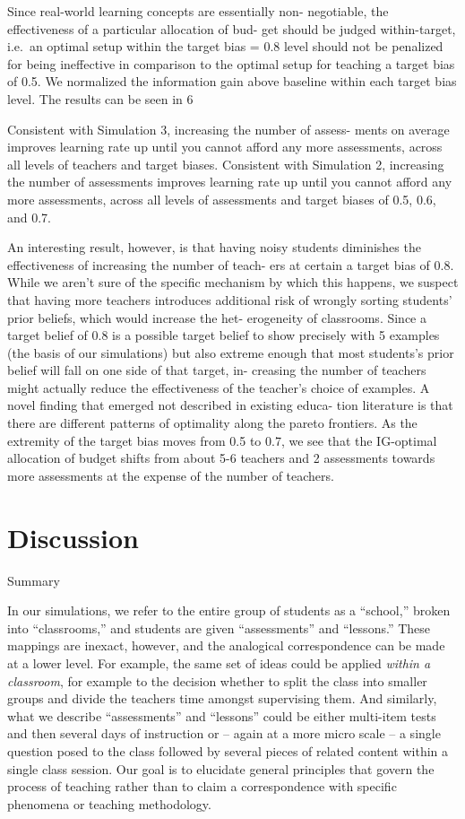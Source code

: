 \documentclass[10pt, letterpaper]{article}
\begin{document}
Since real-world learning concepts are essentially non- negotiable, the
effectiveness of a particular allocation of bud- get should be judged
within-target, i.e.~an optimal setup within the target bias = 0.8 level
should not be penalized for being ineffective in comparison to the
optimal setup for teaching a target bias of 0.5. We normalized the
information gain above baseline within each target bias level. The
results can be seen in 6

Consistent with Simulation 3, increasing the number of assess- ments on
average improves learning rate up until you cannot afford any more
assessments, across all levels of teachers and target biases. Consistent
with Simulation 2, increasing the number of assessments improves
learning rate up until you cannot afford any more assessments, across
all levels of assessments and target biases of 0.5, 0.6, and 0.7.

An interesting result, however, is that having noisy students diminishes
the effectiveness of increasing the number of teach- ers at certain a
target bias of 0.8. While we aren't sure of the specific mechanism by
which this happens, we suspect that having more teachers introduces
additional risk of wrongly sorting students' prior beliefs, which would
increase the het- erogeneity of classrooms. Since a target belief of 0.8
is a possible target belief to show precisely with 5 examples (the basis
of our simulations) but also extreme enough that most students's prior
belief will fall on one side of that target, in- creasing the number of
teachers might actually reduce the effectiveness of the teacher's choice
of examples. A novel finding that emerged not described in existing
educa- tion literature is that there are different patterns of
optimality along the pareto frontiers. As the extremity of the target
bias moves from 0.5 to 0.7, we see that the IG-optimal allocation of
budget shifts from about 5-6 teachers and 2 assessments towards more
assessments at the expense of the number of teachers.

\section{Discussion}\label{discussion}

Summary

In our simulations, we refer to the entire group of students as a
``school,'' broken into ``classrooms,'' and students are given
``assessments'' and ``lessons.'' These mappings are inexact, however,
and the analogical correspondence can be made at a lower level. For
example, the same set of ideas could be applied \emph{within a
classroom}, for example to the decision whether to split the class into
smaller groups and divide the teachers time amongst supervising them.
And similarly, what we describe ``assessments'' and ``lessons'' could be
either multi-item tests and then several days of instruction or -- again
at a more micro scale -- a single question posed to the class followed
by several pieces of related content within a single class session. Our
goal is to elucidate general principles that govern the process of
teaching rather than to claim a correspondence with specific phenomena
or teaching methodology.
\end{document}
